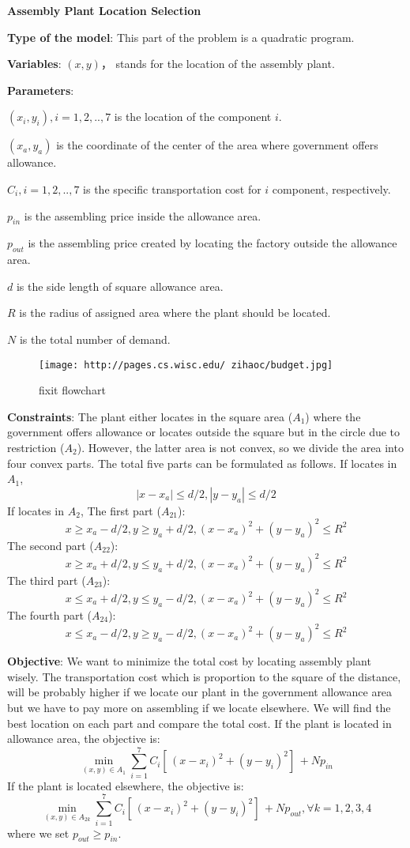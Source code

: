 \documentclass[11pt]{article}
\makeatletter
\def\maxwidth{\ifdim\Gin@nat@width>\linewidth\linewidth
    \else\Gin@nat@width\fi}
\let\Oldincludegraphics\includegraphics
\renewcommand{\includegraphics}[1]{\Oldincludegraphics[width=.8\maxwidth]{#1}}
\makeatother
\begin{document}
\textbf{Assembly Plant Location Selection}

\textbf{Type of the model}: This part of the problem is a quadratic
program.

\textbf{Variables}: \((x, y)\)， stands for the location of the assembly
plant.

\textbf{Parameters}:

\((x_i, y_i), i= 1,2,..,7\) is the location of the component \(i\).

\((x_a, y_a)\) is the coordinate of the center of the area where
government offers allowance.

\(C_i, i= 1,2,..,7\) is the specific transportation cost for \(i\)
component, respectively.

\(p_{in}\) is the assembling price inside the allowance area.

\(p_{out}\) is the assembling price created by locating the factory
outside the allowance area.

\(d\) is the side length of square allowance area.

\(R\) is the radius of assigned area where the plant should be located.

\(N\) is the total number of demand.

\begin{figure}
\centering
\texttt{[image: http://pages.cs.wisc.edu/~zihaoc/budget.jpg]}
\caption{fixit flowchart}
\end{figure}

\textbf{Constraints}: The plant either locates in the square area
(\(A_1\)) where the government offers allowance or locates outside the
square but in the circle due to restriction (\(A_2\)). However, the
latter area is not convex, so we divide the area into four convex parts.
The total five parts can be formulated as follows. If locates in
\(A_1\), \[|x-x_a|\leq d/2, |y-y_a|\leq d/2\] If locates in \(A_2\), The
first part (\(A_{21}\)):
\[x\geq x_a-d/2, y\geq y_a+d/2, (x-x_a)^2+(y-y_a)^2\leq R^2\] The second
part (\(A_{22}\)):
\[x\geq x_a+d/2, y\leq y_a+d/2, (x-x_a)^2+(y-y_a)^2\leq R^2\] The third
part (\(A_{23}\)):
\[x\leq x_a+d/2, y\leq y_a-d/2, (x-x_a)^2+(y-y_a)^2\leq R^2\] The fourth
part (\(A_{24}\)):
\[x\leq x_a-d/2, y\geq y_a-d/2, (x-x_a)^2+(y-y_a)^2\leq R^2\]

\textbf{Objective}: We want to minimize the total cost by locating
assembly plant wisely. The transportation cost which is proportion to
the square of the distance, will be probably higher if we locate our
plant in the government allowance area but we have to pay more on
assembling if we locate elsewhere. We will find the best location on
each part and compare the total cost. If the plant is located in
allowance area, the objective is:
\[\mathop{\min}\limits_{(x,y)\in A_1} \sum_{i=1}^7 C_i  [ \,(x-x_i)^2+(y-y_i)^2]\,+Np_{in}\]
If the plant is located elsewhere, the objective is:
\[\mathop{\min}\limits_{(x,y)\in A_{2k}} \sum_{i=1}^7 C_i  [ \,(x-x_i)^2+(y-y_i)^2]\,+Np_{out}, \forall k= 1,2,3,4\]
where we set \(p_{out}\geq p_{in}\).
\end{document}
